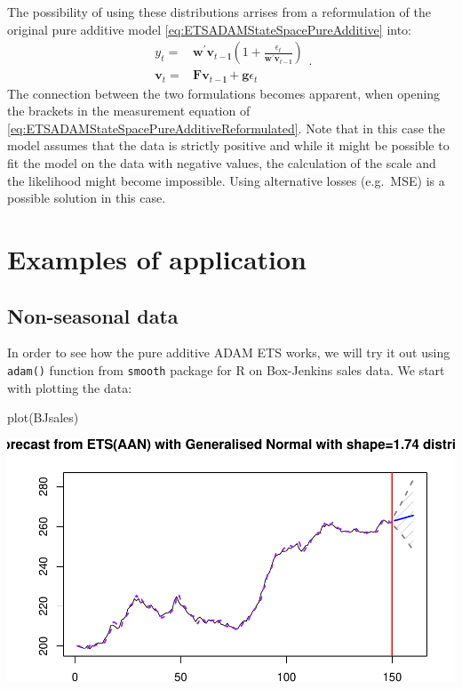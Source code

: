 \documentclass[
]{book}
\newenvironment{Shaded}{\begin{snugshade}}{\end{snugshade}}
\newcommand{\FunctionTok}[1]{\textcolor[rgb]{0.00,0.00,0.00}{#1}}
\newcommand{\NormalTok}[1]{#1}
\theoremstyle{definition}
\theoremstyle{definition}
\theoremstyle{definition}
\theoremstyle{definition}
\theoremstyle{remark}
\begin{document}
The possibility of using these distributions arrises from a reformulation of the original pure additive model \eqref{eq:ETSADAMStateSpacePureAdditive} into:
\begin{equation}
  \begin{aligned}
    {y}_{t} = &\mathbf{w}^\prime \mathbf{v}_{t-\boldsymbol{l}}\left(1 + \frac{\epsilon_t}{\mathbf{w}^\prime \mathbf{v}_{t-\boldsymbol{l}}}\right) \\
    \mathbf{v}_{t} = &\mathbf{F} \mathbf{v}_{t-\boldsymbol{l}} + \mathbf{g} \epsilon_t
  \end{aligned}.
  \label{eq:ETSADAMStateSpacePureAdditiveReformulated}
\end{equation}
The connection between the two formulations becomes apparent, when opening the brackets in the measurement equation of \eqref{eq:ETSADAMStateSpacePureAdditiveReformulated}. Note that in this case the model assumes that the data is strictly positive and while it might be possible to fit the model on the data with negative values, the calculation of the scale and the likelihood might become impossible. Using alternative losses (e.g.~MSE) is a possible solution in this case.

\hypertarget{ADAMETSPureAdditiveExamples}{%
\section{Examples of application}\label{ADAMETSPureAdditiveExamples}}

\hypertarget{non-seasonal-data}{%
\subsection{Non-seasonal data}\label{non-seasonal-data}}

In order to see how the pure additive ADAM ETS works, we will try it out using \texttt{adam()} function from \texttt{smooth} package for R on Box-Jenkins sales data. We start with plotting the data:

\begin{Shaded}
\begin{Highlighting}[]
\FunctionTok{plot}\NormalTok{(BJsales)}
\end{Highlighting}
\end{Shaded}

\includegraphics{adam_files/figure-latex/unnamed-chunk-30-1.pdf}
\end{document}
